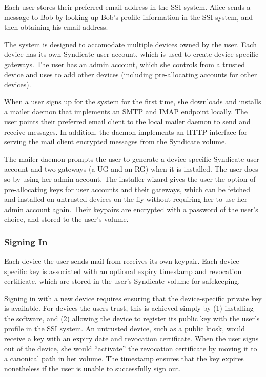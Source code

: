 Each user stores their preferred email address in the SSI system.
Alice sends a message to Bob by looking up Bob's profile
information in the SSI system, and then obtaining his email address.

The system is designed to accomodate multiple devices owned by the user.  Each
device has its own Syndicate user account, which is used to create
device-specific gateways.  The user has an admin account, which she controls
from a trusted device and uses to add other devices (including pre-allocating
accounts for other devices).

When a user signs up for the system for the first time, she downloads and
installs a mailer daemon
that implements an SMTP and IMAP endpoint locally.  The user points their preferred email
client to the local mailer daemon to send and receive messages.  In addition,
the daemon implements an HTTP interface for serving the mail client encrypted
messages from the Syndicate volume.

The mailer daemon prompts the user to generate a device-specific
Syndicate user account and two gateways (a UG and an RG)
when it is installed.  The user does so by using her
admin account.  The installer wizard gives the user the option of pre-allocating
keys for user accounts and their gateways, which can be fetched and installed on untrusted devices
on-the-fly without requiring her to use her admin account again.  Their
keypairs are encrypted with a password of the user's choice, and stored to the user's
volume.

\subsubsection{Signing In}

Each device the user sends mail from receives its own keypair.  Each
device-specific key is associated with an optional expiry timestamp and
revocation certificate, which are stored in the user's Syndicate volume for
safekeeping.

Signing in with a new device requires ensuring that the device-specific private key is
available.  For devices the users trust, this is achieved simply by (1)
installing the software, and (2) allowing the device to register its public key
with the user's profile in the SSI system.  An untrusted device, such as a
public kiosk, would receive a key with an expiry date and revocation certificate.
When the user signs out of the device, she would ``activate'' the revocation
certificate by moving it to a canonical path in her volume.  The timestamp
ensures that the key expires nonetheless if the user is unable to successfully
sign out.

